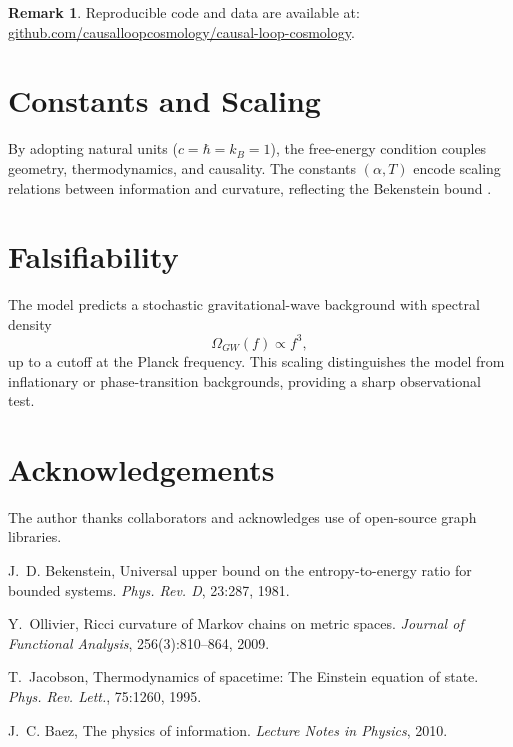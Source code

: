 \documentclass[11pt]{article}
\theoremstyle{definition}
\newtheorem{remark}[definition]{Remark}
\begin{document}
\begin{remark}
Reproducible code and data are available at: \href{https://github.com/causalloopcosmology/causal-loop-cosmology}{github.com/causalloopcosmology/causal-loop-cosmology}.
\end{remark}

\section{Constants and Scaling}

By adopting natural units ($c = \hbar = k_B = 1$), the free-energy condition couples geometry, thermodynamics, and causality. The constants $(\alpha, T)$ encode scaling relations between information and curvature, reflecting the Bekenstein bound \cite{bekenstein1981universal}.

\section{Falsifiability}

The model predicts a stochastic gravitational-wave background with spectral density
\[
\Omega_{GW}(f) \propto f^3,
\]
up to a cutoff at the Planck frequency. This scaling distinguishes the model from inflationary or phase-transition backgrounds, providing a sharp observational test.

\section*{Acknowledgements}
The author thanks collaborators and acknowledges use of open-source graph libraries.


\begin{thebibliography}{9}

J.~D. Bekenstein,
\newblock Universal upper bound on the entropy-to-energy ratio for bounded systems.
\newblock \emph{Phys. Rev. D}, 23:287, 1981.

Y.~Ollivier,
\newblock Ricci curvature of Markov chains on metric spaces.
\newblock \emph{Journal of Functional Analysis}, 256(3):810–864, 2009.

T.~Jacobson,
\newblock Thermodynamics of spacetime: The Einstein equation of state.
\newblock \emph{Phys. Rev. Lett.}, 75:1260, 1995.

J.~C. Baez,
\newblock The physics of information.
\newblock \emph{Lecture Notes in Physics}, 2010.

\end{thebibliography}
\end{document}
